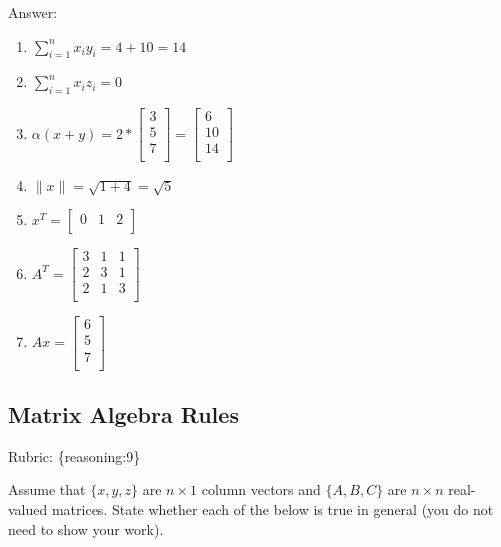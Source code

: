 \documentclass{article}
\def\rubric#1{\gre{Rubric: \{#1\}}}{}
\def\blu#1{{\color{blu}#1}}
\def\gre#1{{\color{gre}#1}}
\def\norm#1{\|#1\|}
\def\enum#1{\begin{enumerate}#1\end{enumerate}}
\begin{document}
\textcolor{gre}{
Answer:
\enum{
\item $\sum_{i=1}^n x_iy_i=4+10=14$
\item $\sum_{i=1}^n x_iz_i=0$
\item $\alpha(x+y)=2*\left[\begin{array}{c}
3\\
5\\
7\\
\end{array}\right]=\left[\begin{array}{c}
6\\
10\\
14\\
\end{array}\right]$
\item $\norm{x}=\sqrt{1+4}=\sqrt{5}$
\item $x^T=\left[\begin{array}{ccc}
0&1&2\\
\end{array}\right]$
\item $A^T=\left[\begin{array}{ccc}
3&1&1\\
2&3&1\\
2&1&3\\
\end{array}\right]
$
\item  $Ax=\left[\begin{array}{c}
6\\
5\\
7\\
\end{array}\right]$
}
}
\subsection{Matrix Algebra Rules}
\rubric{reasoning:9}

Assume that $\{x,y,z\}$ are $n \times 1$ column vectors and $\{A,B,C\}$ are $n \times n$ real-valued matrices. \blu{State whether each of the below is true in general} (you do not need to show your work).
\end{document}
